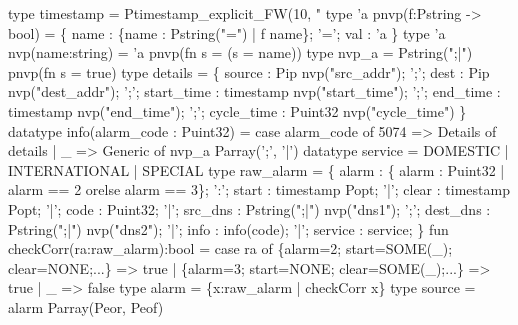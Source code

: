 \begin{code}
type timestamp = Ptimestamp_explicit_FW(10, "%
\mbox{}
type 'a pnvp(f:Pstring -> bool) =
      \{ name : \{name : Pstring("=") | f name\}; 
        '='; 
        val : 'a \}
type 'a nvp(name:string) = 'a pnvp(fn s = (s = name))
type nvp_a = Pstring(";|") pnvp(fn s = true)
\mbox{}
type details = \{
      source      : Pip nvp("src_addr");
';';  dest        : Pip nvp("dest_addr");
';';  start_time  : timestamp nvp("start_time");
';';  end_time    : timestamp nvp("end_time");
';';  cycle_time  : Puint32 nvp("cycle_time")
\}
\mbox{}
datatype info(alarm_code : Puint32) =
  case alarm_code of 
    5074 => Details of details
  | _    => Generic of nvp_a Parray(';', '|')
\mbox{}
datatype service = DOMESTIC | INTERNATIONAL | SPECIAL
\mbox{}
type raw_alarm = \{
       alarm    : \{ alarm : Puint32 | alarm == 2 orelse alarm == 3\};
 ':';  start    : timestamp Popt;
 '|';  clear    : timestamp Popt;
 '|';  code     : Puint32;
 '|';  src_dns  : Pstring(";|") nvp("dns1");
 ';';  dest_dns : Pstring(";|") nvp("dns2");
 '|';  info     : info(code);
 '|';  service  : service;
\}
\mbox{}
fun checkCorr(ra:raw_alarm):bool =
  case ra of 
    \{alarm=2; start=SOME(_); clear=NONE;...\} => true
  | \{alarm=3; start=NONE;    clear=SOME(_);...\} => true
  |  _ => false
\mbox{}
type alarm = \{x:raw_alarm | checkCorr x\}
\mbox{}
type source = alarm Parray(Peor, Peof)
\end{code}
